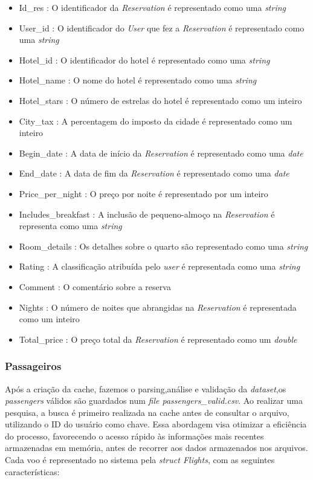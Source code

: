 \documentclass[11pt]{article}
\begin{document}
     \begin{itemize}
        \item Id_res : O identificador da \textit{Reservation} é representado como uma \textit{string}
        \item User_id : O identificador do \textit{User} que fez a \textit{Reservation} é representado como uma \textit{string}
        \item Hotel_id : O identificador do hotel é representado como uma \textit{string}
        \item Hotel_name : O nome do hotel é representado como uma \textit{string}
        \item Hotel_stars : O número de estrelas do hotel é representado como um inteiro
        \item City_tax : A percentagem do imposto da cidade é representado como um inteiro
        \item Begin_date : A data de início da \textit{Reservation} é representado como uma \textit{date}
        \item End_date : A data de fim da \textit{Reservation} é representado como uma \textit{date}
        \item Price_per_night : O preço por noite é representado por um inteiro
        \item Includes_breakfast : A inclusão de pequeno-almoço na \textit{Reservation} é representa como uma \textit{string}
        \item Room_details : Os detalhes sobre o quarto são representado como uma \textit{string} 
        \item Rating : A classificação atribuída pelo \textit{user} é representada como uma \textit{string}
        \item Comment : O comentário sobre a reserva 
        \item Nights : O número de noites que abrangidas na \textit{Reservation} é representada como um inteiro
        \item Total_price : O preço total da \textit{Reservation} é representado como um \textit{double}
    \end{itemize}
\newpage
\subsubsection{Passageiros}

       Após a criação da cache, fazemos o parsing,análise e validação da \textit{dataset},os \textit{passengers} válidos são guardados num \textit{file passengers_valid.csv}. Ao realizar uma pesquisa, a busca é primeiro realizada na cache antes de consultar o arquivo, utilizando o ID do usuário como chave. Essa abordagem visa otimizar a eficiência do processo, favorecendo o acesso rápido às informações mais recentes armazenadas em memória, antes de recorrer aos dados armazenados nos arquivos.
    Cada voo é representado no sistema pela \textit{struct Flights}, com as seguintes características:
    
\end{document}

